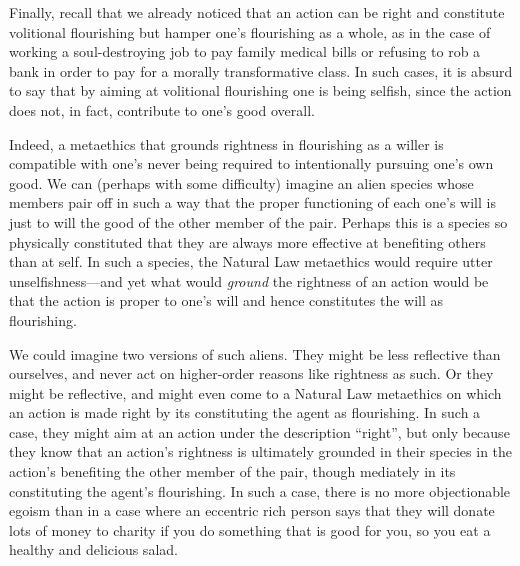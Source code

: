 Finally, recall that we already noticed that an action can be right and constitute volitional flourishing but hamper one's flourishing as 
a whole, as in the case of working a soul-destroying job to pay family medical bills or refusing to rob a bank in order to pay for a 
morally transformative class. In such cases, it is absurd to say that by aiming at volitional flourishing one is being selfish, since the
action does not, in fact, contribute to one's good overall.

Indeed, a metaethics that grounds rightness in flourishing as a willer is compatible with one's never being required to intentionally pursuing one's own good.
We can (perhaps with some difficulty) imagine an alien species whose members pair off in such a way that the proper functioning of
each one's will is just to will the good of the other member of the pair. Perhaps this is a species so physically constituted that
they are always more effective at benefiting others than at self. In such a species, the Natural Law metaethics would require 
utter unselfishness---and yet what would \textit{ground} the rightness of an action would be that the action is proper to one's
will and hence constitutes the will as flourishing. 

We could imagine two versions of such aliens. They might be less reflective
than ourselves, and never act on higher-order reasons like rightness as such. Or they might be reflective, and might even come to
a Natural Law metaethics on which an action is made right by its constituting the agent as flourishing. In such a case, they might
aim at an action under the description ``right'', but only because they know that an action's rightness is ultimately grounded in their 
species in the action's benefiting the other member of the pair, though mediately in its constituting the agent's flourishing. 
In such a case, there is no more objectionable egoism than in a case where an eccentric rich person says that they
will donate lots of money to charity if you do something that is good for you, so you eat a healthy and delicious salad. 

